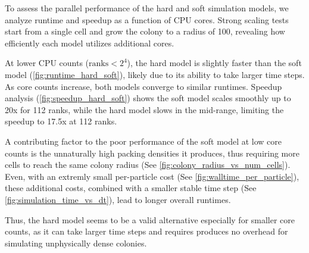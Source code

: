 \documentclass[conference]{IEEEtran}
\begin{document}
To assess the parallel performance of the hard and soft simulation models, we analyze runtime and speedup as a function of CPU cores. Strong scaling tests start from a single cell and grow the colony to a radius of 100, revealing how efficiently each model utilizes additional cores.

At lower CPU counts ($\text{ranks}< 2^4$), the hard model is slightly faster than the soft model (\autoref{fig:runtime_hard_soft}), likely due to its ability to take larger time steps. As core counts increase, both models converge to similar runtimes. Speedup analysis (\autoref{fig:speedup_hard_soft}) shows the soft model scales smoothly up to 20x for 112 ranks, while the hard model slows in the mid-range, limiting the speedup to 17.5x at 112 ranks.

A contributing factor to the poor performance of the soft model at low core counts is the unnaturally high packing densities it produces, thus requiring more cells to reach the same colony radius (See \autoref{fig:colony_radius_vs_num_cells}). Even, with an extremly small per-particle cost (See \autoref{fig:walltime_per_particle}), these additional costs, combined with a smaller stable time step (See \autoref{fig:simulation_time_vs_dt}), lead to longer overall runtimes.

Thus, the hard model seems to be a valid alternative especially for smaller core counts, as it can take larger time steps and requires produces no overhead for simulating unphysically dense colonies.
\end{document}
